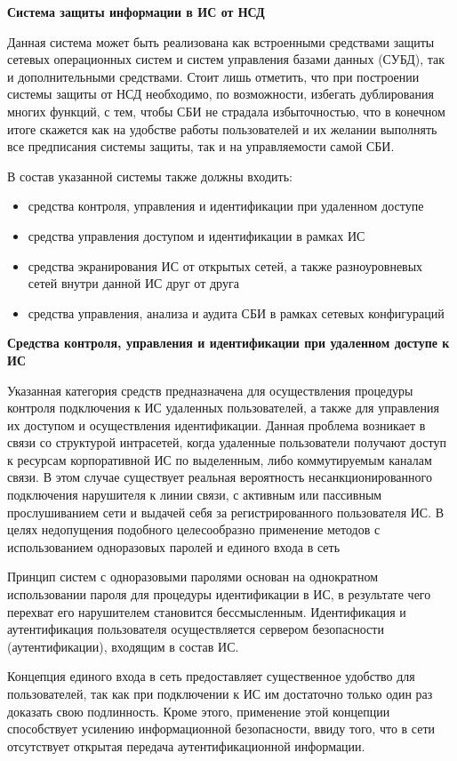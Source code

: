 \bigbreak
\textbf{Система защиты информации в ИС от НСД}

Данная система может быть реализована как встроенными средствами защиты сетевых операционных
систем и систем управления базами данных (СУБД), так и дополнительными средствами. Стоит лишь отметить,
что при построении системы защиты от НСД необходимо, по возможности, избегать дублирования многих функций,
с тем, чтобы СБИ не страдала избыточностью, что в конечном итоге скажется как на удобстве работы
пользователей и их желании выполнять все предписания системы защиты, так и на управляемости самой СБИ.

В состав указанной системы также должны входить:
\begin{itemize}
    \item средства контроля, управления и идентификации при удаленном доступе
    \item средства управления доступом и идентификации в рамках ИС
    \item средства экранирования ИС от открытых сетей, а также разноуровневых сетей внутри данной ИС друг от друга
    \item средства управления, анализа и аудита СБИ в рамках сетевых конфигураций
\end{itemize}

\bigbreak
\textbf{Средства контроля, управления и идентификации при удаленном доступе к ИС}

Указанная категория средств предназначена для осуществления процедуры контроля подключения к ИС удаленных пользователей,
а также для управления их доступом и осуществления идентификации. Данная проблема возникает в связи со структурой
интрасетей, когда удаленные пользователи получают доступ к ресурсам корпоративной ИС по выделенным,
либо коммутируемым каналам связи. В этом случае существует реальная вероятность несанкционированного подключения
нарушителя к линии связи, с активным или пассивным прослушиванием сети и выдачей себя за
регистрированного пользователя ИС. В целях недопущения подобного целесообразно применение методов с
использованием одноразовых паролей и единого входа в сеть

Принцип систем с одноразовыми паролями основан на однократном использовании пароля для процедуры
идентификации в ИС, в результате чего перехват его нарушителем становится бессмысленным.
Идентификация и аутентификация пользователя осуществляется сервером безопасности (аутентификации), входящим в состав ИС.

Концепция единого входа в сеть предоставляет существенное удобство для пользователей, так как при
подключении к ИС им достаточно только один раз доказать свою подлинность. Кроме этого, применение
этой концепции способствует усилению информационной безопасности, ввиду того, что в сети
отсутствует открытая передача аутентификационной информации.

